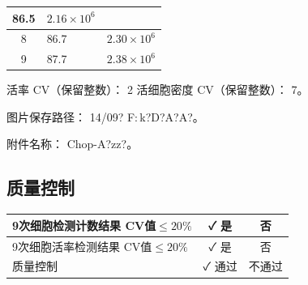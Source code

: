 \documentclass[UTF8,10pt,a4paper,fontset=fandol]{ctexart}
\newcommand{\fieldvalue}[1]{#1}
\newcommand{\handwritten}[1]{#1}
\begin{document}
\begin{center}
\begin{tabularx}{\textwidth}{|c|X|X|}
\fieldvalue{\handwritten{86.5}} &
\fieldvalue{\handwritten{$2.16\times10^{6}$}}\\
\hline
8 &
\fieldvalue{\handwritten{86.7}} &
\fieldvalue{\handwritten{$2.30\times10^{6}$}}\\
\hline
9 &
\fieldvalue{\handwritten{87.7}} &
\fieldvalue{\handwritten{$2.38\times10^{6}$}}\\
\hline
\end{tabularx}
\end{center}

活率 CV（保留整数）：
\fieldvalue{\handwritten{2}}
\qquad
活细胞密度 CV（保留整数）：
\fieldvalue{\handwritten{7}}。

图片保存路径：
\fieldvalue{\handwritten{14/09? F:\,k?D?A?A?}}。

附件名称：
\fieldvalue{\handwritten{Chop-A?zz?}}。

\subsection*{质量控制}

\begin{tabularx}{\textwidth}{|X|c|c|}
\hline
9次细胞检测计数结果 CV值$\leq20\%$ &
\fieldvalue{\handwritten{✓ 是}} & 否\\
\hline
9次细胞活率检测结果 CV值$\leq20\%$ &
\fieldvalue{\handwritten{✓ 是}} & 否\\
\hline
质量控制 &
\fieldvalue{\handwritten{✓ 通过}} & 不通过\\
\hline
\end{tabularx}
\end{document}
